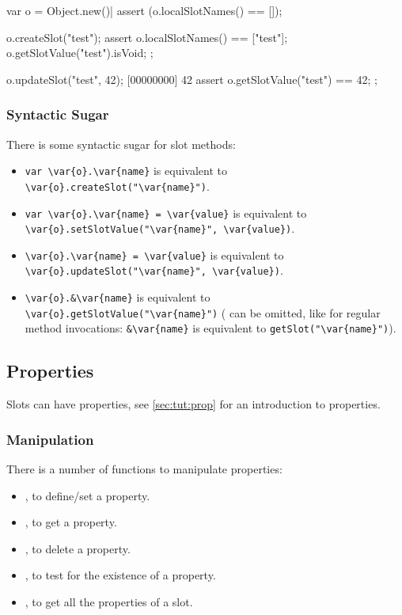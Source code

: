 \begin{urbiscript}
var o = Object.new()|
assert (o.localSlotNames() == []);

o.createSlot("test");
assert
{
  o.localSlotNames() == ["test"];
  o.getSlotValue("test").isVoid;
};

o.updateSlot("test", 42);
[00000000] 42
assert
{
  o.getSlotValue("test") == 42;
};
\end{urbiscript}

\subsubsection{Syntactic Sugar}

There is some syntactic sugar for slot methods:
\begin{itemize}
\item \lstinline|var \var{o}.\var{name}| is equivalent to
  \lstinline[style=varInString]|\var{o}.createSlot("\var{name}")|.
\item \lstinline|var \var{o}.\var{name} = \var{value}| is equivalent to
  \lstinline[style=varInString]|\var{o}.setSlotValue("\var{name}", \var{value})|.
\item \lstinline|\var{o}.\var{name} = \var{value}| is equivalent to
  \lstinline[style=varInString]|\var{o}.updateSlot("\var{name}", \var{value})|.
\item \lstinline|\var{o}.&\var{name}| is equivalent to
  \lstinline[style=varInString]|\var{o}.getSlotValue("\var{name}")| ( can
  be omitted, like for regular method invocations: \lstinline|&\var{name}|
  is equivalent to \lstinline[style=varInString]|getSlot("\var{name}")|).
\end{itemize}


\subsection{Properties}
\label{sec:lang:prop}
\label{sec:lang:prop:std}


Slots can have properties, see \autoref{sec:tut:prop} for an introduction to
properties.

\subsubsection{Manipulation}

There is a number of functions to manipulate properties:
\begin{itemize}
\item {}, to define/set a property.
\item {}, to get a property.
\item {}, to delete a property.
\item {}, to test for the existence of a
  property.
\item {}, to get all the properties of a slot.
\end{itemize}

